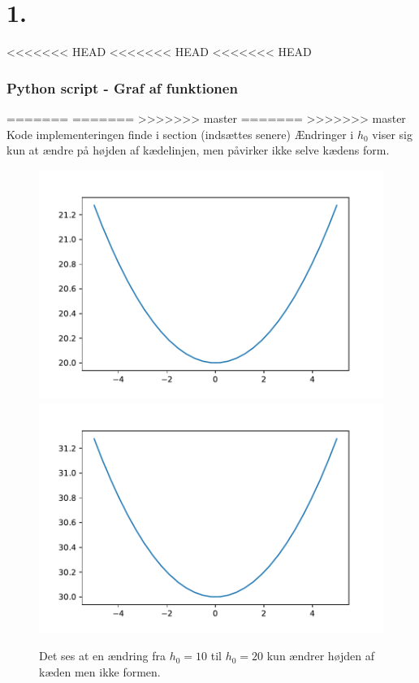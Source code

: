 \section*{1.}
<<<<<<< HEAD
<<<<<<< HEAD
<<<<<<< HEAD
% 
\subsubsection*{Python script - Graf af funktionen}
%

%
=======
=======
>>>>>>> master
=======
>>>>>>> master
Kode implementeringen finde i section (indsættes senere)
% 
Ændringer i $h_0$ viser sig kun at ændre på højden af kædelinjen, men påvirker ikke selve kædens form.

\begin{figure}[h!]
\includegraphics[scale=0.5]{code/fig1}
\includegraphics[scale=0.5]{code/fig2}
\caption{Det ses at en ændring fra $h_0=10$ til $h_0=20$ kun ændrer højden af kæden men ikke formen.}
\end{figure}



